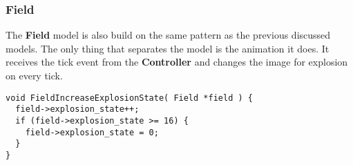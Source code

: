 \subsubsection{Field}
The {\bf Field} model is also build on the same pattern as the previous discussed models. The only
thing that separates the model is the animation it does. It receives the tick event from the {\bf
  Controller} and changes the image for explosion on every tick.
\begin{lstlisting}
void FieldIncreaseExplosionState( Field *field ) {
  field->explosion_state++;
  if (field->explosion_state >= 16) {
    field->explosion_state = 0;
  }
}
\end{lstlisting}
